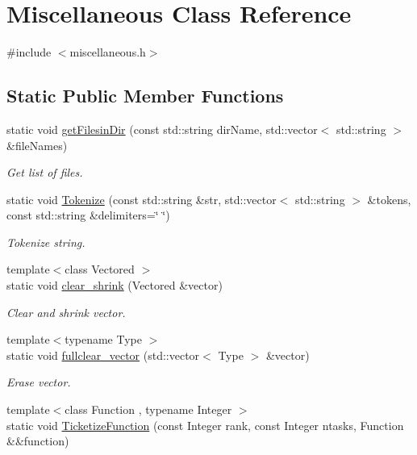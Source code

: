 \hypertarget{classMiscellaneous}{\section{Miscellaneous Class Reference}
\label{classMiscellaneous}
}


{\ttfamily \#include $<$miscellaneous.\-h$>$}

\subsection*{Static Public Member Functions}
\begin{DoxyCompactItemize}
\item 
static void \hyperlink{classMiscellaneous_ab2e7e14c71f55175408771dc8203ba37}{get\-Filesin\-Dir} (const std\-::string dir\-Name, std\-::vector$<$ std\-::string $>$ \&file\-Names)
\begin{DoxyCompactList}\small\item\em Get list of files. \end{DoxyCompactList}\item 
static void \hyperlink{classMiscellaneous_afec3bd8996aef65aa8f7decd1012cf2f}{Tokenize} (const std\-::string \&str, std\-::vector$<$ std\-::string $>$ \&tokens, const std\-::string \&delimiters=\char`\"{} \char`\"{})
\begin{DoxyCompactList}\small\item\em Tokenize string. \end{DoxyCompactList}\item 
{\footnotesize template$<$class Vectored $>$ }\\static void \hyperlink{classMiscellaneous_a1ff6af49b68e17d0713d97602788b978}{clear\-\_\-shrink} (Vectored \&vector)
\begin{DoxyCompactList}\small\item\em Clear and shrink vector. \end{DoxyCompactList}\item 
{\footnotesize template$<$typename Type $>$ }\\static void \hyperlink{classMiscellaneous_a8b1c5459f07c92139c14bc8adeac597e}{fullclear\-\_\-vector} (std\-::vector$<$ Type $>$ \&vector)
\begin{DoxyCompactList}\small\item\em Erase vector. \end{DoxyCompactList}\item 
{\footnotesize template$<$class Function , typename Integer $>$ }\\static void \hyperlink{classMiscellaneous_a9048b321c011475a6399550bcdd9346b}{Ticketize\-Function} (const Integer rank, const Integer ntasks, Function \&\&function)

\end{DoxyCompactItemize}

